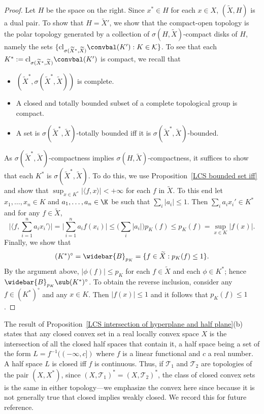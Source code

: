 \begin{proof}
Let $H$ be the space on the right. Since $x^*\in H$ for each $x\in X$, $(\widetilde{X},H)$ is a dual pair. To show that $H=\widetilde{X}'$, we show that the compact-open topology is the polar topology generated by a collection of $\sigma(H,\widetilde{X})$-compact disks of $H$, namely the sets $\{\mathrm{cl}_{\sigma(\widetilde{X}^*,\widetilde{X})}\convbal(K'):K\in\mathcal{K}\}$. To see that each $K^*:=\mathrm{cl}_{\sigma(\widetilde{X}^*,\widetilde{X})}\convbal(K')$ is compact, we recall that
\begin{itemize}
\item $(\widetilde{X}^*,\sigma(\widetilde{X}^*,\widetilde{X}))$ is complete.
\item A closed and totally bounded subset of a complete topological group is compact.
\item A set is $\sigma(\widetilde{X}^*,\widetilde{X})$-totally bounded iff it is $\sigma(\widetilde{X}^*,\widetilde{X})$-bounded.
\end{itemize}
As $\sigma(\widetilde{X}^*,\widetilde{X})$-compactness implies $\sigma(H,\widetilde{X})$-compactness, it suffices to show that each $K^*$ is $\sigma(\widetilde{X}^*,\widetilde{X})$. To do this, we use Proposition~\ref{LCS bounded set iff} and show that $\sup_{x\in K^*}|\langle f,x\rangle|<+\infty$ for each $f$ in $\widetilde{X}$. To this end let $x_1,\dots,x_n\in K$ and $a_1,\dots,a_n\in\K$ be such that $\sum_i|a_i|\leq 1$. Then $\sum_ia_ix_i'\in K^*$ and for any $f\in\widetilde{X}$,
\[\Big|\langle f,\sum_{i=1}^{n}a_ix_i'\rangle\Big|=\Big|\sum_{i=1}^{n}a_if(x_i)\Big|\leq\Big(\sum_i|a_i|\Big)p_K(f)\leq p_K(f)=\sup_{x\in K}|f(x)|.\]Finally, we show that
\[(K^*)^\circ=\widebar{B}_{p_K}=\{f\in\widetilde{X}:p_K(f)\leq 1\}.\]
By the argument above, $|\phi(f)|\leq p_K$ for each $f\in\widetilde{X}$ and each $\phi\in K^*$; hence $\widebar{B}_{p_K}\sub(K^*)^\circ$. To obtain the reverse inclusion, consider any $f\in(K^*)^\circ$ and any $x\in K$. Then $|f(x)|\leq 1$ and it follows that $p_K(f)\leq 1$ .
\end{proof}
The result of Proposition~\ref{LCS intersection of hyperplane and half plane}(b) states that any closed convex set in a real locally convex space $X$ is the intersection of all the closed half spaces that contain it, a half space being a set of the form $L=f^{-1}((-\infty,c])$ where $f$ is a linear functional and $c$ a real number. A half space $L$ is closed iff $f$ is continuous. Thus, if $\mathcal{T}_1$ and $\mathcal{T}_2$ are topologies of the pair $(X,X^*)$, since $(X,\mathcal{T}_1)^*=(X,\mathcal{T}_2)^*$, the class of closed convex sets is the same in either topology---we emphasize the convex here since because it is not generally true that closed implies weakly closed. We record this for future reference.

